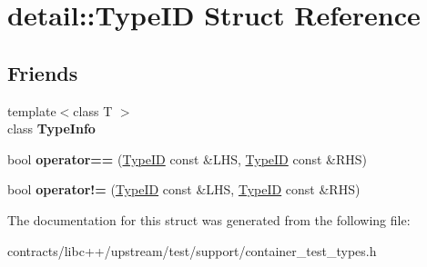 \hypertarget{structdetail_1_1_type_i_d}{}\section{detail\+:\+:Type\+ID Struct Reference}
\label{structdetail_1_1_type_i_d}
\subsection*{Friends}
\begin{DoxyCompactItemize}
\item 
\mbox{\label{structdetail_1_1_type_i_d_a386d6d768e1b984961bb392c68aba28e}} 
{\footnotesize template$<$class T $>$ }\\class {\bfseries Type\+Info}
\item 
\mbox{\label{structdetail_1_1_type_i_d_ad9f878594c68ffc553b8cf0346a68054}} 
bool {\bfseries operator==} (\mbox{\hyperlink{structdetail_1_1_type_i_d}{Type\+ID}} const \&L\+HS, \mbox{\hyperlink{structdetail_1_1_type_i_d}{Type\+ID}} const \&R\+HS)
\item 
\mbox{\label{structdetail_1_1_type_i_d_af6dbea093ed54a9e1a199ed4fe004399}} 
bool {\bfseries operator!=} (\mbox{\hyperlink{structdetail_1_1_type_i_d}{Type\+ID}} const \&L\+HS, \mbox{\hyperlink{structdetail_1_1_type_i_d}{Type\+ID}} const \&R\+HS)
\end{DoxyCompactItemize}


The documentation for this struct was generated from the following file\+:\begin{DoxyCompactItemize}
\item 
contracts/libc++/upstream/test/support/container\+\_\+test\+\_\+types.\+h\end{DoxyCompactItemize}
